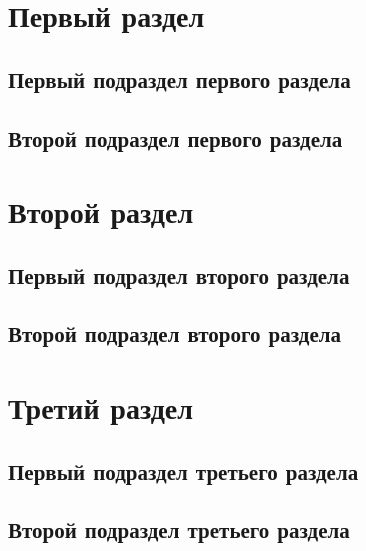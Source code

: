 

\newcommand{\teacher}{Преподавателев~П.П.}
\newcommand{\subject}{Наименование дисциплины}
\newcommand{\theme}{Наименование темы}
\newcommand{\student}{Иванов~И.И.}
\newcommand{\groupnumber}{0000}
\newcommand{\group}{Группа 0000}





\setcounter{page}{2}



\section{Первый раздел}
\subsection{Первый подраздел первого раздела}

\subsection{Второй подраздел первого раздела}

\newpage
\section{Второй раздел}
\subsection{Первый подраздел второго раздела}

\subsection{Второй подраздел второго раздела}

\newpage
\section{Третий раздел}
\subsection{Первый подраздел третьего раздела}

\subsection{Второй подраздел третьего раздела}

